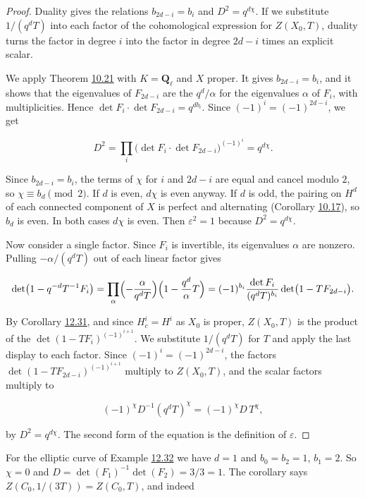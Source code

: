 \documentclass[11pt]{article}
\begin{document}
\begin{proof}[{Proof}]\label{bp326}%
Duality gives the relations \(b_{2d-i}=b_i\) and \(D^2=q^{d\chi}\). If we substitute \(1/(q^dT)\) into each factor of the cohomological expression for \(Z(X_0,T)\), duality turns the factor in degree \(i\) into the factor in degree \(2d-i\) times an explicit scalar.

We apply Theorem \hyperref[bp165]{10.21} with \(K=\mathbf Q_\ell\) and \(X\) proper. It gives \(b_{2d-i}=b_i\), and it shows that the eigenvalues of \(F_{2d-i}\) are the \(q^d/\alpha\) for the eigenvalues \(\alpha\) of \(F_i\), with multiplicities. Hence \(\det F_i\cdot\det F_{2d-i}=q^{db_i}\). Since \((-1)^i=(-1)^{2d-i}\), we get

\[
D^2=\prod_i\bigl(\det F_i\cdot\det F_{2d-i}\bigr)^{(-1)^i}
=q^{d\chi}.
\]

Since \(b_{2d-i}=b_i\), the terms of \(\chi\) for \(i\) and \(2d-i\) are equal and cancel modulo \(2\), so \(\chi\equiv b_d\pmod 2\). If \(d\) is even, \(d\chi\) is even anyway. If \(d\) is odd, the pairing on \(H^d\) of each connected component of \(X\) is perfect and alternating (Corollary \hyperref[bp152]{10.17}), so \(b_d\) is even. In both cases \(d\chi\) is even. Then \(\varepsilon^2=1\) because \(D^2=q^{d\chi}\).

Now consider a single factor. Since \(F_i\) is invertible, its eigenvalues \(\alpha\) are nonzero. Pulling \(-\alpha/(q^dT)\) out of each linear factor gives

\[
\det\bigl(1-q^{-d}T^{-1}F_i\bigr)
=\prod_\alpha\Bigl(-\frac{\alpha}{q^dT}\Bigr)\Bigl(1-\frac{q^d}{\alpha}T\Bigr)
=(-1)^{b_i}\frac{\det F_i}{(q^dT)^{b_i}}\det\bigl(1-TF_{2d-i}\bigr).
\]

By Corollary \hyperref[bp320]{12.31}, and since \(H^i_c=H^i\) as \(X_0\) is proper, \(Z(X_0,T)\) is the product of the \(\det(1-TF_i)^{(-1)^{i+1}}\). We substitute \(1/(q^dT)\) for \(T\) and apply the last display to each factor. Since \((-1)^i=(-1)^{2d-i}\), the factors \(\det(1-TF_{2d-i})^{(-1)^{i+1}}\) multiply to \(Z(X_0,T)\), and the scalar factors multiply to

\[
(-1)^{\chi}D^{-1}(q^dT)^{\chi}=(-1)^{\chi}D\,T^{\chi},
\]

by \(D^2=q^{d\chi}\). The second form of the equation is the definition of \(\varepsilon\).
\end{proof}

\label{bp327}%
For the elliptic curve of Example \hyperref[bp323]{12.32} we have \(d=1\) and \(b_0=b_2=1\), \(b_1=2\). So \(\chi=0\) and \(D=\det(F_1)^{-1}\det(F_2)=3/3=1\). The corollary says \(Z(C_0,1/(3T))=Z(C_0,T)\), and indeed
\end{document}
